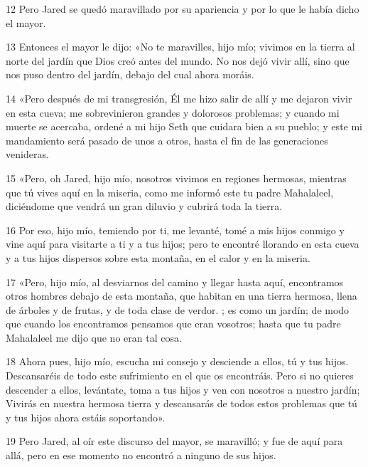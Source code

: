\par 12 Pero Jared se quedó maravillado por su apariencia y por lo que le había dicho el mayor.

\par 13 Entonces el mayor le dijo: «No te maravilles, hijo mío; vivimos en la tierra al norte del jardín que Dios creó antes del mundo. No nos dejó vivir allí, sino que nos puso dentro del jardín, debajo del cual ahora moráis.

\par 14 «Pero después de mi transgresión, Él me hizo salir de allí y me dejaron vivir en esta cueva; me sobrevinieron grandes y dolorosos problemas; y cuando mi muerte se acercaba, ordené a mi hijo Seth que cuidara bien a su pueblo; y este mi mandamiento será pasado de unos a otros, hasta el fin de las generaciones venideras.

\par 15 «Pero, oh Jared, hijo mío, nosotros vivimos en regiones hermosas, mientras que tú vives aquí en la miseria, como me informó este tu padre Mahalaleel, diciéndome que vendrá un gran diluvio y cubrirá toda la tierra.

\par 16 Por eso, hijo mío, temiendo por ti, me levanté, tomé a mis hijos conmigo y vine aquí para visitarte a ti y a tus hijos; pero te encontré llorando en esta cueva y a tus hijos dispersos sobre esta montaña, en el calor y en la miseria.

\par 17 «Pero, hijo mío, al desviarnos del camino y llegar hasta aquí, encontramos otros hombres debajo de esta montaña, que habitan en una tierra hermosa, llena de árboles y de frutas, y de toda clase de verdor. ; es como un jardín; de modo que cuando los encontramos pensamos que eran vosotros; hasta que tu padre Mahalaleel me dijo que no eran tal cosa.

\par 18 Ahora pues, hijo mío, escucha mi consejo y desciende a ellos, tú y tus hijos. Descansaréis de todo este sufrimiento en el que os encontráis. Pero si no quieres descender a ellos, levántate, toma a tus hijos y ven con nosotros a nuestro jardín; Vivirás en nuestra hermosa tierra y descansarás de todos estos problemas que tú y tus hijos ahora estáis soportando».

\par 19 Pero Jared, al oír este discurso del mayor, se maravilló; y fue de aquí para allá, pero en ese momento no encontró a ninguno de sus hijos.

